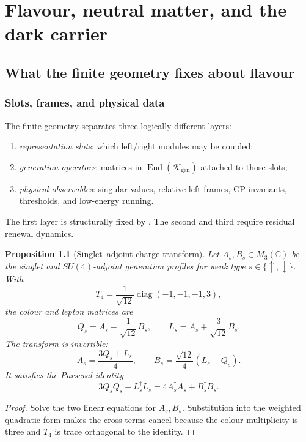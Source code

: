 \documentclass[11pt,oneside,openany]{book}
\numberwithin{equation}{chapter}
\newtheorem{proposition}[theorem]{Proposition}
\theoremstyle{definition}
\theoremstyle{remark}
\newcommand{\C}{\mathbb C}
\newcommand{\End}{\operatorname{End}}
\newcommand{\diag}{\operatorname{diag}}
\newcommand{\Kgen}{\mathcal K_{\mathrm{gen}}}
\begin{document}
\part{Flavour, neutral matter, and the dark carrier}

\chapter{What the finite geometry fixes about flavour}
\label{ch:flavour-boundary}

\section{Slots, frames, and physical data}
The finite geometry separates three logically different layers:
\begin{enumerate}[label=\textup{(\roman*)},leftmargin=2.2em]
\item \emph{representation slots}: which left/right modules may be coupled;
\item \emph{generation operators}: matrices in $\End(\Kgen)$ attached to those slots;
\item \emph{physical observables}: singular values, relative left frames, CP invariants, thresholds, and low-energy running.
\end{enumerate}
The first layer is structurally fixed by .  The second and third require residual renewal dynamics.

\begin{proposition}[Singlet--adjoint charge transform]
\label{prop:charge-transform}
Let $A_s,B_s\in M_3(\C)$ be the singlet and $SU(4)$-adjoint generation profiles for weak type $s\in\{\uparrow,\downarrow\}$.  With
\[
 T_4=\frac1{\sqrt{12}}\diag(-1,-1,-1,3),
\]
the colour and lepton matrices are
\[
 Q_s=A_s-\frac1{\sqrt{12}}B_s,
 \qquad
 L_s=A_s+\frac3{\sqrt{12}}B_s.
\]
The transform is invertible:
\[
 \boxed{
 A_s=\frac{3Q_s+L_s}{4},
 \qquad
 B_s=\frac{\sqrt{12}}4(L_s-Q_s).
 }
\]
It satisfies the Parseval identity
\[
 \boxed{
 3Q_s^\dagger Q_s+L_s^\dagger L_s
 =4A_s^\dagger A_s+B_s^\dagger B_s.
 }
\]
\end{proposition}

\begin{proof}
Solve the two linear equations for $A_s,B_s$.  Substitution into the weighted quadratic form makes the cross terms cancel because the colour multiplicity is three and $T_4$ is trace orthogonal to the identity.
\end{proof}
\end{document}
